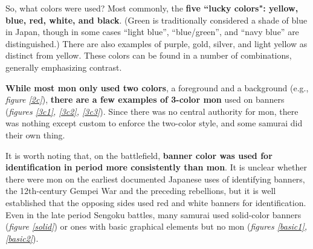 \documentclass{article}
\begin{document}
  So, what colors were used?  Most commonly, the \textbf{five ``lucky
  colors": yellow, blue,
  red, white, and
  black}. (Green is traditionally considered
  a shade of blue in Japan, though in some cases ``light blue'',
  ``blue/green'', and ``navy blue'' are distinguished.) There are also examples
  of purple, gold, silver, and light yellow as distinct from yellow.
  These colors can be found in a number of
  combinations, generally emphasizing contrast.

  \textbf{While most mon only used two colors}, a foreground and a background
  (e.g., \emph{figure \ref{2c}}), \textbf{there are a few examples of 3-color mon}
  used on banners (\emph{figures \ref{3c1}, \ref{3c2},
  \ref{3c3}}). Since there was no central
  authority for mon, there was nothing except custom to enforce the
  two-color style, and some samurai did their own thing.

  It is worth noting that, on the battlefield, \textbf{banner color was used for identification in period more
  consistently than mon}.  It is unclear whether there were mon on the
  earliest documented Japanese uses of identifying banners, the
  12th-century Gempei War and the preceding rebellions, but it is well
  established that the opposing sides used red and white banners for
  identification. Even in the late period
  Sengoku battles, many samurai used solid-color
  banners (\emph{figure \ref{solid}}) or ones with basic graphical
  elements but no mon (\emph{figures \ref{basic1}, \ref{basic2}}).

\clearpage

  \begin{figure}
  \begin{subfigs}
  \end{subfigs}
  \begin{subfigs}
  \end{subfigs}
  \end{figure}
\end{document}
